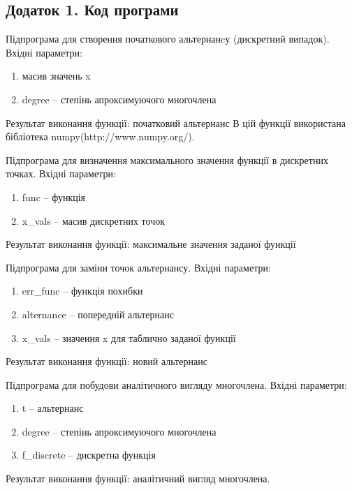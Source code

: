 \documentclass[ukrainian,14pt]{extarticle}
\begin{document}
\subsection*{Додаток 1. Код програми}

Підпрограма для створення початкового альтернанcу (дискретний випадок).
Вхідні параметри:
\begin{enumerate}
    \item масив значень x
    \item degree – степінь апроксимуючого многочлена
\end{enumerate}
Результат виконання функції: початковий альтернанс
В цій функції використана бібліотека numpy(http://www.numpy.org/).




\vspace{1cm}

Підпрограма для визначення максимального значення функції в дискретних точках.
Вхідні параметри:
\begin{enumerate}
    \item func – функція
    \item  x_vals – масив дискретних точок
\end{enumerate}
Результат виконання функції: максимальне значення заданої функції


\vspace{1cm}


Підпрограма для заміни точок альтернансу.
Вхідні параметри:
\begin{enumerate}
    \item err_func – функція похибки
    \item alternance – попередній альтернанс
    \item  x_vals – значення x для таблично заданої функції
\end{enumerate}
Результат виконання функції: новий альтернанс

\vspace{1cm}

Підпрограма для побудови аналітичного вигляду многочлена.
Вхідні параметри:
\begin{enumerate}
    \item t – альтернанс
    \item degree – степінь апроксимуючого многочлена
    \item f_discrete – дискретна функція
\end{enumerate}
Результат виконання функції: аналітичний вигляд многочлена.
\end{document}
